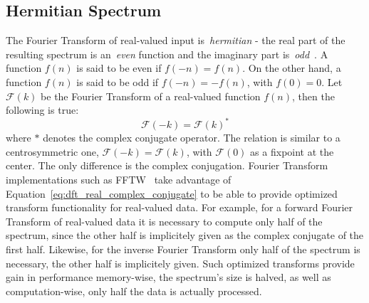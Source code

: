 \subsection{Hermitian Spectrum}
The Fourier Transform of real-valued input is~\emph{hermitian} - the real part of the resulting spectrum
is an~\emph{even} function and the imaginary part is~\emph{odd}~\citep{book:bracewell2000fourier}.
A function $f(n)$ is said to be even if
$f(-n) = f(n)$. On the other hand, a function $f(n)$ is said to be odd if $f(-n) = -f(n)$,
with $f(0) = 0$. Let $\mathcal{F}(k)$ be the Fourier Transform of a real-valued function $f(n)$, then
the following is true:
\begin{equation}
\label{eq:dft_real_complex_conjugate}
 \mathcal{F}(-k) = \mathcal{F}(k)^*
\end{equation}
where $*$ denotes the complex conjugate operator. The relation is similar to a centrosymmetric one,
$\mathcal{F}(-k) = \mathcal{F}(k)$, with $\mathcal{F}(0)$ as a fixpoint at the center. The only
difference is the complex conjugation. Fourier Transform implementations such as FFTW~\citep{FFTW05}
take advantage of Equation~\ref{eq:dft_real_complex_conjugate} to be able to provide optimized
transform functionality for real-valued data. For example, for a forward Fourier Transform of real-valued data it is
necessary to compute only half of the spectrum, since the other half is implicitely given as the
complex conjugate of the first half. Likewise, for the inverse Fourier Transform only half of the
spectrum is necessary, the other half is implicitely given. Such optimized transforms provide
gain in performance memory-wise, the spectrum's size is halved, as well as computation-wise, only
half the data is actually processed.
%

